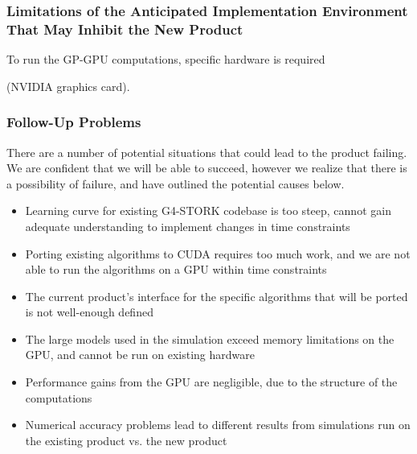 \documentclass[12pt]{article}
\newcommand{\todo}[1]{\textcolor{red}{[TODO: #1]}} \else
\newcommand{\authornote}[3]{} \newcommand{\todo}[1]{} \fi
\newcommand{\ds}[1]{\authornote{blue}{DS}{#1}} %
\newcommand{\mmp}[1]{\authornote{green}{MP}{#1}}
\begin{document}
\subsubsection{Limitations of the Anticipated Implementation Environment That May Inhibit the New Product}
To run the GP-GPU computations, specific hardware is required
\ds{You should stop here, unless you explained (in the constraints section)
why you need an NVIDIA card. Also, what is ``recent"?}\mmp{I explained why we need an NVIDIA card. did not explain recent. TODO}
(NVIDIA graphics card).

\subsubsection{Follow-Up Problems}
There are a number of potential situations that could lead to the product failing. We are confident that we will be able to succeed, however we realize that there is a possibility of failure, and have outlined the potential causes below.
\begin{itemize}
\item Learning curve for existing G4-STORK codebase is too steep, cannot gain adequate understanding to implement changes in time constraints
\item Porting existing algorithms to CUDA requires too much work, and we are not able to run the algorithms on a GPU within time constraints
\item The current product's interface for the specific algorithms that will be ported is not well-enough defined
\item The large models used in the simulation exceed memory limitations on the GPU, and cannot be run on existing hardware
\item Performance gains from the GPU are negligible, due to the structure of the computations
\item Numerical accuracy problems lead to different results from simulations run on the existing product vs. the new product
\end{itemize}

\end{document}
